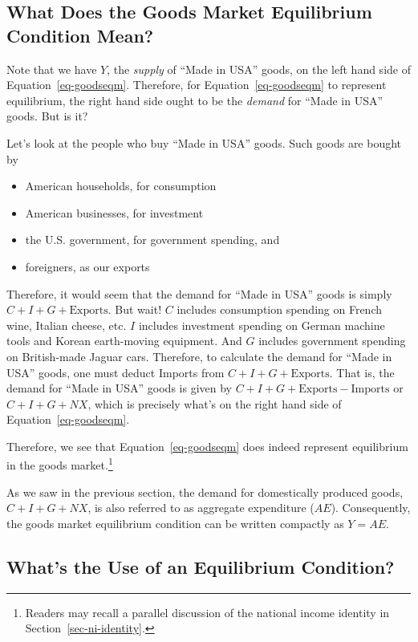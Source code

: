 \documentclass[
  letterpaper,
]{book}
\providecommand{\tightlist}{%
  \setlength{\itemsep}{0pt}\setlength{\parskip}{0pt}}\usepackage{longtable,booktabs,array}
\theoremstyle{plain}
\theoremstyle{remark}
\begin{document}
\subsection{What Does the Goods Market Equilibrium Condition
Mean?}\label{sec-goodseqmmeaning}

Note that we have \(Y\), the \emph{supply} of ``Made in USA'' goods, on
the left hand side of Equation~\ref{eq-goodseqm}. Therefore, for
Equation~\ref{eq-goodseqm} to represent equilibrium, the right hand side
ought to be the \emph{demand} for ``Made in USA'' goods. But is it?

Let's look at the people who buy ``Made in USA'' goods. Such goods are
bought by

\begin{itemize}
\tightlist
\item
  American households, for consumption
\item
  American businesses, for investment
\item
  the U.S. government, for government spending, and
\item
  foreigners, as our exports
\end{itemize}

Therefore, it would seem that the demand for ``Made in USA'' goods is
simply \(C+I+G+\text{Exports}\). But wait! \(C\) includes consumption
spending on French wine, Italian cheese, etc. \(I\) includes investment
spending on German machine tools and Korean earth-moving equipment. And
\(G\) includes government spending on British-made Jaguar cars.
Therefore, to calculate the demand for ``Made in USA'' goods, one must
deduct Imports from \(C+I+G+\text{Exports}\). That is, the demand for
``Made in USA'' goods is given by
\(C+I+G+\text{Exports}-\text{Imports}\) or \(C+I+G+NX\), which is
precisely what's on the right hand side of Equation~\ref{eq-goodseqm}.

Therefore, we see that Equation~\ref{eq-goodseqm} does indeed represent
equilibrium in the goods market.\footnote{Readers may recall a parallel
  discussion of the national income identity in
  Section~\ref{sec-ni-identity}.}

As we saw in the previous section, the demand for domestically produced
goods, \(C+I+G+NX\), is also referred to as aggregate expenditure
(\(AE\)). Consequently, the goods market
equilibrium condition can be written compactly as \(Y=AE\).

\subsection{What's the Use of an Equilibrium
Condition?}\label{sec-useeqmcon}
\end{document}
